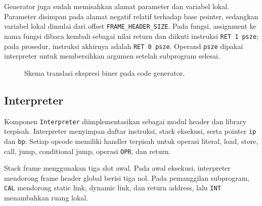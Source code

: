 \documentclass[11pt,a4paper]{article}
\begin{document}
Generator juga sudah memisahkan alamat parameter dan variabel lokal. Parameter
disimpan pada alamat negatif relatif terhadap base pointer, sedangkan variabel
lokal dimulai dari offset \texttt{FRAME\_HEADER\_SIZE}. Pada fungsi, assignment
ke nama fungsi dibaca kembali sebagai nilai return dan diikuti instruksi
\texttt{RET 1 psze}; pada prosedur, instruksi akhirnya adalah
\texttt{RET 0 psze}. Operand \texttt{psze} dipakai interpreter untuk
membersihkan argumen setelah subprogram selesai.

\begin{figure}[H]
\centering
{}
\caption{Skema translasi ekspresi biner pada code generator.}
\label{fig:binop}
\end{figure}

\subsection{Interpreter}

Komponen \texttt{Interpreter} diimplementasikan sebagai modul header dan
library terpisah. Interpreter menyimpan daftar instruksi, stack eksekusi,
serta pointer \texttt{ip} dan \texttt{bp}. Setiap opcode memiliki handler
terpisah untuk operasi literal, load, store, call, jump, conditional jump,
operasi \texttt{OPR}, dan return.

Stack frame menggunakan tiga slot awal. Pada awal eksekusi, interpreter
mendorong frame header global berisi tiga nol. Pada pemanggilan subprogram,
\texttt{CAL} mendorong static link, dynamic link, dan return address, lalu
\texttt{INT} menambahkan ruang lokal.
\end{document}
